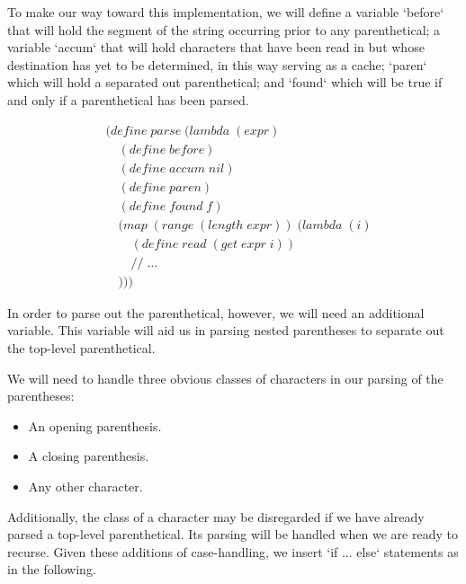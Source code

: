 To make our way toward this implementation, we will define a variable `before` that will 
hold the segment of the string occurring prior to any parenthetical; a variable `accum` 
that will hold characters that have been read in but whose destination has yet to be 
determined, in this way serving as a cache; `paren` which will hold a separated out 
parenthetical; and `found` which will be true if and only if a parenthetical has been 
parsed.

\begin{align*}
& (define \; parse \; (lambda \; (expr) \; 
\\& \quad (define \; before)
\\& \quad (define \; accum \; nil)
\\& \quad (define \; paren)
\\& \quad (define \; found \; f)
\\& \quad (map \; (range \; (length \; expr)) \; (lambda \; (i)
\\& \qquad (define \; read \; (get \; expr \; i))
\\& \qquad // \; \dots
\\& \quad )))
\end{align*}

In order to parse out the parenthetical, however, we will need an additional variable. 
This variable will aid us in parsing nested parentheses to separate out the top-level parenthetical.

We will need to handle three obvious classes of characters in our parsing of the parentheses:

\begin{itemize}
  \item An opening parenthesis.
  \item A closing parenthesis.
  \item Any other character.
\end{itemize}

Additionally, the class of a character may be disregarded if we have already parsed a 
top-level parenthetical. Its parsing will be handled when we are ready to recurse. Given 
these additions of case-handling, we insert `if ... else` statements as in the following.

